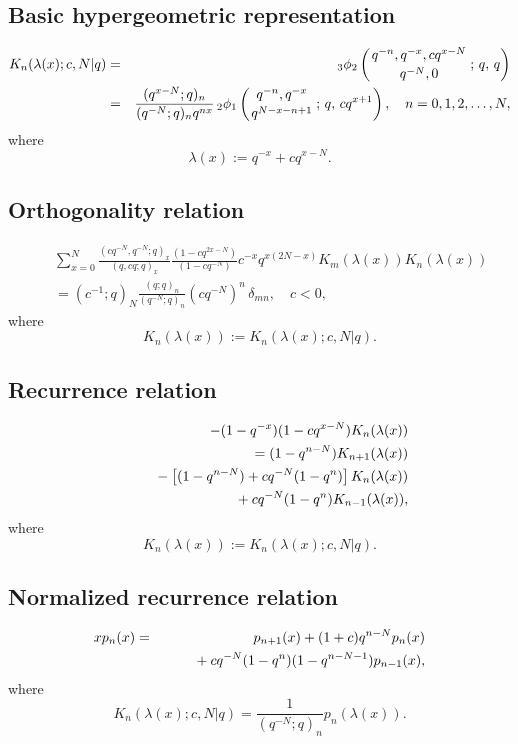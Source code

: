 \documentclass[envcountchap,graybox]{svmono}
\newcommand{\qhyp}[5]{\mbox{}_{#1}{\phi}_{#2}
\left(\genfrac{}{}{0pt}{}{#3}{#4}\,;\,q,\,#5\right)}
\newcommand{\mathindent}{\hspace{7.5mm}}
\begin{document}
\subsection*{Basic hypergeometric representation}
\begin{eqnarray}
\label{DefDualqKrawtchouk}
K_n(\lambda(x);c,N|q)&=&\qhyp{3}{2}{q^{-n},q^{-x},cq^{x-N}}{q^{-N},0}{q}\\
&=&\frac{(q^{x-N};q)_n}{(q^{-N};q)_nq^{nx}}\,
\qhyp{2}{1}{q^{-n},q^{-x}}{q^{N-x-n+1}}{cq^{x+1}},\quad n=0,1,2,\ldots,N,\nonumber
\end{eqnarray}
where
$$\lambda(x):=q^{-x}+cq^{x-N}.$$

\subsection*{Orthogonality relation}
\begin{eqnarray}
\label{OrtDualqKrawtchouk}
& &\sum_{x=0}^N\frac{(cq^{-N},q^{-N};q)_x}{(q,cq;q)_x}
\frac{(1-cq^{2x-N})}{(1-cq^{-N})}c^{-x}q^{x(2N-x)}K_m(\lambda(x))K_n(\lambda(x))\nonumber\\
& &{}=(c^{-1};q)_N\frac{(q;q)_n}{(q^{-N};q)_n}(cq^{-N})^n\,\delta_{mn},\quad c<0,
\end{eqnarray}
where
$$K_n(\lambda(x)):=K_n(\lambda(x);c,N|q).$$

\newpage

\subsection*{Recurrence relation}
\begin{eqnarray}
\label{RecDualqKrawtchouk}
& &-(1-q^{-x})(1-cq^{x-N})K_n(\lambda(x))\nonumber\\
& &{}=(1-q^{n-N})K_{n+1}(\lambda(x))\nonumber\\
& &{}\mathindent{}-\left[(1-q^{n-N})+cq^{-N}(1-q^n)\right]K_n(\lambda(x))\nonumber\\
& &{}\mathindent\mathindent{}+cq^{-N}(1-q^n)K_{n-1}(\lambda(x)),
\end{eqnarray}
where
$$K_n(\lambda(x)):=K_n(\lambda(x);c,N|q).$$

\subsection*{Normalized recurrence relation}
\begin{eqnarray}
\label{NormRecDualqKrawtchouk}
xp_n(x)&=&p_{n+1}(x)+(1+c)q^{n-N}p_n(x)\nonumber\\
& &{}\mathindent{}+cq^{-N}(1-q^n)(1-q^{n-N-1})p_{n-1}(x),
\end{eqnarray}
where
$$K_n(\lambda(x);c,N|q)=\frac{1}{(q^{-N};q)_n}p_n(\lambda(x)).$$
\end{document}
